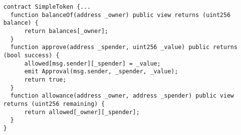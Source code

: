 \begin{lstlisting}[language=Solidity]
contract SimpleToken {...
  function balanceOf(address _owner) public view returns (uint256 balance) {
      return balances[_owner];
  }
  function approve(address _spender, uint256 _value) public returns (bool success) {
      allowed[msg.sender][_spender] = _value;
      emit Approval(msg.sender, _spender, _value);
      return true;
  }
  function allowance(address _owner, address _spender) public view returns (uint256 remaining) {
      return allowed[_owner][_spender];
  }
}
\end{lstlisting}